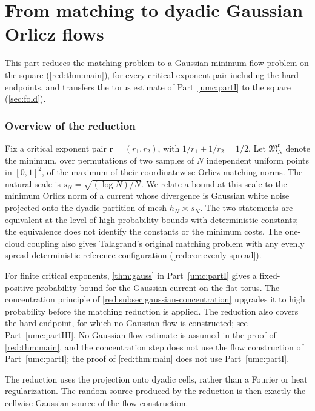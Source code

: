 \documentclass[11pt]{article}
\theoremstyle{definition}
\theoremstyle{remark}
\numberwithin{equation}{section}
\begin{document}
\clearpage
\part{From matching to dyadic Gaussian Orlicz flows}\label{umc:partII}

This part reduces the matching problem to a Gaussian minimum-flow problem
on the square (\cref{red:thm:main}), for every critical exponent pair
including the hard endpoints, and transfers the torus estimate of
Part~\ref{umc:partI} to the square (\cref{sec:fold}).

\section{Overview of the reduction}\label{sec:interface}

Fix a critical exponent pair $\boldsymbol r=(r_1,r_2)$, with
$1/r_1+1/r_2=1/2$. Let $\mathfrak M_N^{\boldsymbol r}$ denote the minimum,
over permutations of two samples of $N$ independent uniform points in
$[0,1]^2$, of the maximum of their coordinatewise Orlicz matching norms.
The natural scale is $s_N=\sqrt{(\log N)/N}$. We relate a bound at this
scale to the minimum Orlicz norm of a current whose divergence is Gaussian
white noise projected onto the dyadic partition of mesh $h_N\asymp s_N$.
The two statements are equivalent at the level of high-probability bounds
with deterministic constants; the equivalence does not identify the
constants or the minimum costs. The one-cloud coupling also gives
Talagrand's original matching problem with any evenly spread deterministic
reference configuration (\cref{red:cor:evenly-spread}).

For finite critical exponents, \cref{thm:gauss} in Part~\ref{umc:partI}
gives a fixed-positive-probability bound for the Gaussian current on the
flat torus. The concentration principle of
\cref{red:subsec:gaussian-concentration} upgrades it to high probability
before the matching reduction is applied. The reduction also covers the
hard endpoint, for which no Gaussian flow is constructed; see
Part~\ref{umc:partIII}. No Gaussian flow estimate is assumed in the proof
of \cref{red:thm:main}, and the concentration step does not use the flow
construction of Part~\ref{umc:partI}; the proof of \cref{red:thm:main}
does not use Part~\ref{umc:partI}.

The reduction uses the projection onto dyadic cells, rather than a
Fourier or heat regularization. The random source produced by the
reduction is then exactly the cellwise Gaussian source of the flow
construction.
\end{document}
